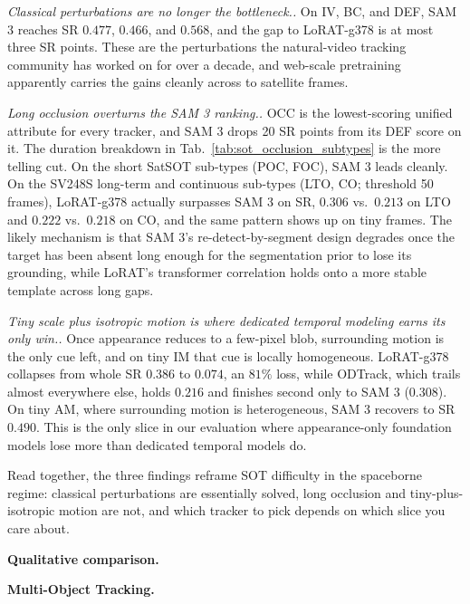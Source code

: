 \documentclass{article}
\newcommand{\subhead}[1]{\noindent\textbf{#1.}}
\newcommand{\minihead}[1]{\noindent\textit{#1.}}
\begin{document}
\minihead{Classical perturbations are no longer the
bottleneck.}
On IV, BC, and DEF, SAM 3 reaches SR $0.477$, $0.466$, and $0.568$,
and the gap to LoRAT-g378 is at most three SR points. These are the
perturbations the natural-video tracking community has worked on for
over a decade, and web-scale pretraining apparently carries the
gains cleanly across to satellite frames.

\minihead{Long occlusion overturns the SAM 3 ranking.}
OCC is the lowest-scoring unified attribute for every tracker, and
SAM 3 drops 20 SR points from its DEF score on it. The duration
breakdown in Tab.~\ref{tab:sot_occlusion_subtypes} is the more
telling cut. On the short SatSOT sub-types (POC, FOC), SAM 3 leads
cleanly. On the SV248S long-term and continuous sub-types (LTO, CO;
threshold 50 frames), LoRAT-g378 actually surpasses SAM 3 on SR,
$0.306$ vs.\ $0.213$ on LTO and $0.222$ vs.\ $0.218$ on CO, and the
same pattern shows up on tiny frames. The likely mechanism is that
SAM 3's re-detect-by-segment design degrades once the target has
been absent long enough for the segmentation prior to lose its
grounding, while LoRAT's transformer correlation holds onto a more
stable template across long gaps.

\minihead{Tiny scale plus isotropic motion is where dedicated
temporal modeling earns its only win.}
Once appearance reduces to a few-pixel blob, surrounding motion is
the only cue left, and on tiny IM that cue is locally homogeneous.
LoRAT-g378 collapses from whole SR $0.386$ to $0.074$, an $81\%$
loss, while ODTrack, which trails almost everywhere else, holds
$0.216$ and finishes second only to SAM 3 ($0.308$). On tiny AM,
where surrounding motion is heterogeneous, SAM 3 recovers to SR
$0.490$. This is the only slice in our evaluation where
appearance-only foundation models lose more than dedicated temporal
models do.

Read together, the three findings reframe SOT difficulty in the
spaceborne regime: classical perturbations are essentially solved,
long occlusion and tiny-plus-isotropic motion are not, and which
tracker to pick depends on which slice you care about.

\subhead{Qualitative comparison}

\subhead{Multi-Object Tracking}
\end{document}
